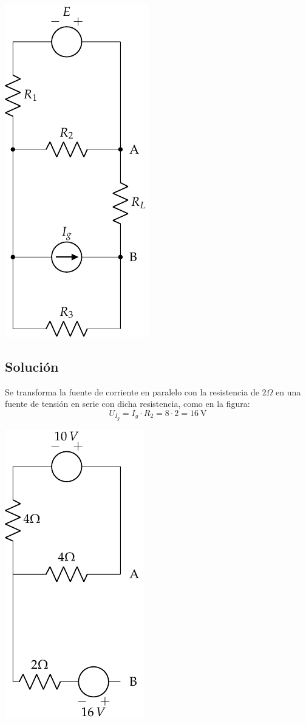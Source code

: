 \begin{center}
  \includegraphics{figuras/BT1_17.pdf}
\end{center}


\subsection*{Solución}
Se transforma la fuente de corriente en paralelo con la resistencia de
$2\Omega$ en una fuente de tensión en serie con dicha resistencia,
como en la figura:
\begin{equation*}
  U_{I_g}=I_g\cdot R_2=8\cdot 2=\qty{16}{\volt}
\end{equation*}

\begin{center}
  \includegraphics{figuras/BT1_17_mallas.pdf}
\end{center}


